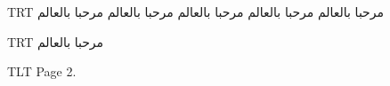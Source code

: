 \documentclass{article}
\begin{document}
\textdir TRT مرحبا بالعالم مرحبا بالعالم مرحبا بالعالم مرحبا بالعالم مرحبا بالعالم
\par
\newpage
\textdir TRT مرحبا بالعالم
\par
\textdir TLT Page 2.
\end{document}
